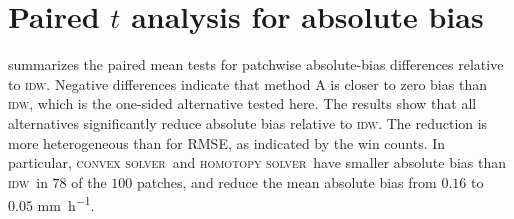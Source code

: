 \documentclass[a4paper,fleqn]{cas-sc}
\DeclareRobustCommand{\IDW}{\textsc{idw}}
\DeclareRobustCommand{\solverConvex}{\textsc{convex solver}}
\DeclareRobustCommand{\solverHomotopy}{\textsc{homotopy solver}}
\DeclareRobustCommand{\ConvexSolver}{\solverConvex}
\DeclareRobustCommand{\Homotopy}{\solverHomotopy}
\begin{document}
\section*{Paired $t$ analysis for absolute bias}

 summarizes the paired mean tests for patchwise absolute-bias differences relative to \IDW. Negative differences indicate that method A is closer to zero bias than \IDW, which is the one-sided alternative tested here. The results show that all alternatives significantly reduce absolute bias relative to \IDW. The reduction is more heterogeneous than for RMSE, as indicated by the win counts. In particular, \ConvexSolver\ and \Homotopy\ have smaller absolute bias than \IDW\ in $78$ of the $100$ patches, and reduce the mean absolute bias from $0.16$ to $0.05$ \si{\milli\meter\per\hour}.

\end{document}
